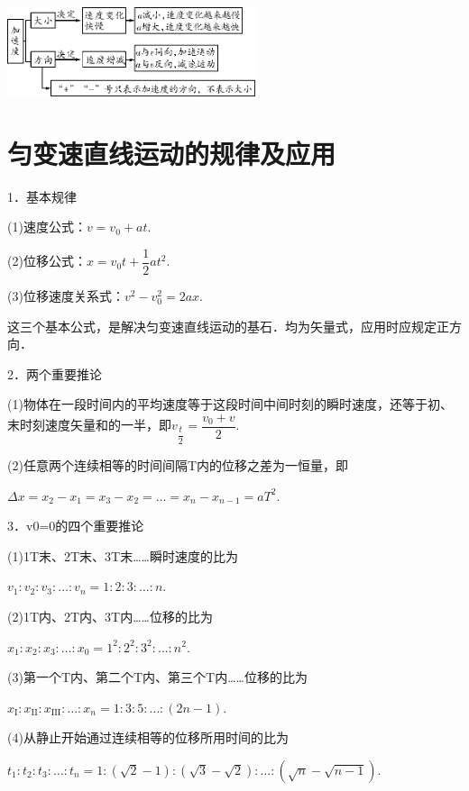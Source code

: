 \begin{center}\includegraphics[width=2.86458in,height=1.03125in]{media/image16.png}\end{center}

\newpage
\section{匀变速直线运动的规律及应用}



1．基本规律

(1)速度公式：$v=v_{0}+a t$.

(2)位移公式：$x=v_{0} t+\dfrac{1}{2} a t^2$.

(3)位移速度关系式：$v^{2}-v_{0}^{2}=2 a x$.

这三个基本公式，是解决匀变速直线运动的基石．均为矢量式，应用时应规定正方向．

2．两个重要推论

(1)物体在一段时间内的平均速度等于这段时间中间时刻的瞬时速度，还等于初、末时刻速度矢量和的一半，即$v_{\dfrac{t}{2}}=\dfrac{v_{0}+v}{2}$.

(2)任意两个连续相等的时间间隔T内的位移之差为一恒量，即

$\Delta x=x_{2}-x_{1}=x_{3}-x_{2}=\ldots=x_{n}-x_{n-1}=a T^{2}$.

3．v0=0的四个重要推论

(1)1T末、2T末、3T末\ldots\ldots 瞬时速度的比为

$v_{1} : v_{2} : v_{3} : \ldots : v_{n}=1 : 2 : 3 : \ldots : n$.

(2)1T内、2T内、3T内\ldots\ldots 位移的比为

$x_{1} : x_{2} : x_{3} : \ldots : x_{0}=1^{2} : 2^{2} : 3^{2} : \ldots : n^{2}$.

(3)第一个T内、第二个T内、第三个T内\ldots\ldots 位移的比为

$x_{\mathrm{I}} : x_{\mathrm{II}} : x_{\mathrm{III}} : \ldots : x_{n}=1 : 3 : 5 : \ldots :(2 n-1)$.

(4)从静止开始通过连续相等的位移所用时间的比为

$t_{1} : t_{2} : t_{3} : \ldots : t_{n}=1 :(\sqrt{2}-1) :(\sqrt{3}-\sqrt{2}) : \ldots :(\sqrt{n}-\sqrt{n-1})$.

